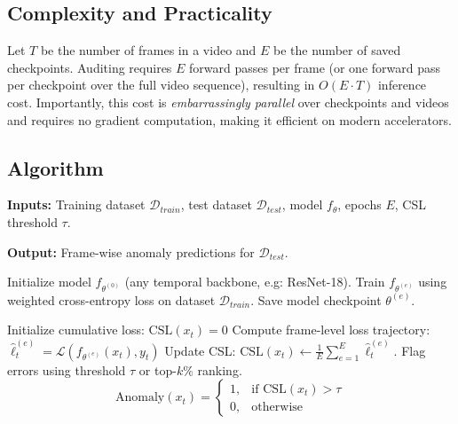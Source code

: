 \documentclass{article}
\theoremstyle{plain}
\theoremstyle{definition}
\theoremstyle{remark}
\begin{document}
\subsection{Complexity and Practicality}
Let $T$ be the number of frames in a video and $E$ be the number of saved checkpoints. Auditing requires $E$ forward passes per frame (or one forward pass per checkpoint over the full video sequence), resulting in $O(E\cdot T)$ inference cost. Importantly, this cost is \emph{embarrassingly parallel} over checkpoints and videos and requires no gradient computation, making it efficient on modern accelerators.

\vspace{-0.4em}
\subsection{Algorithm}
\begin{algorithm}[H]
\caption{Annotation Error Detection via CSL}
\label{alg:csl_framework}
\textbf{Inputs:} Training dataset $\mathcal{D}_{train}$, test dataset $\mathcal{D}_{test}$, model $f_{\theta}$, epochs $E$, CSL threshold $\tau$.

\textbf{Output:} Frame-wise anomaly predictions for $\mathcal{D}_{test}$.

\begin{algorithmic}[1]
\STATE Initialize model $f_{\theta^{(0)}}$ (any temporal backbone, e.g: ResNet-18).
    \STATE Train $f_{\theta^{(e)}}$ using weighted cross-entropy loss on dataset $\mathcal{D}_{train}$.
    \STATE Save model checkpoint $\theta^{(e)}$.
\ENDFOR

        \STATE Initialize cumulative loss: $ \text{CSL}(x_t) = 0 $
            \STATE Compute frame-level loss trajectory: $\hat{\ell}_t^{(e)} = \mathcal{L}(f_{\theta^{(e)}}(x_t), y_t)$
            \STATE Update CSL: $\text{CSL}(x_t) \leftarrow \frac{1}{E}\sum_{e=1}^{E}\hat{\ell}^{(e)}_t$.
        \ENDFOR
    \ENDFOR
    \STATE Flag errors using threshold $\tau$ or top-$k\%$ ranking.
    \[ \text{Anomaly}(x_t) = \begin{cases} 1, & \text{if CSL}(x_t) > \tau \\ 0, & \text{otherwise} \end{cases} \]
\ENDFOR
\end{algorithmic}
\end{algorithm}
\end{document}
